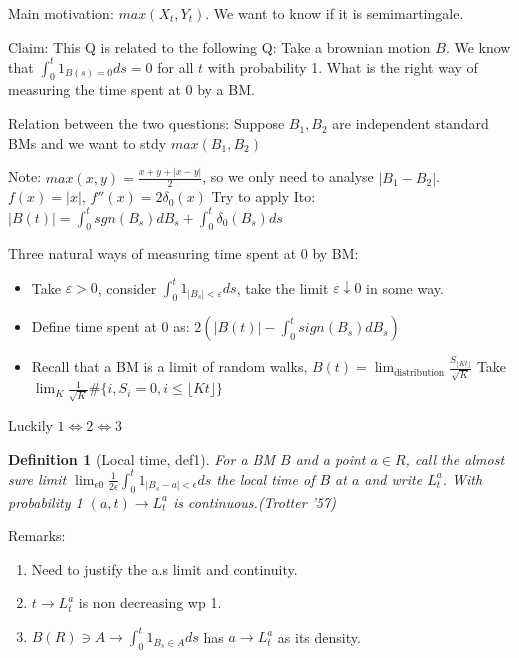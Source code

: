 \documentclass{article}
\newtheorem{definition}{Definition}
\begin{document}
Main motivation:
$max(X_t, Y_t)$. We want to know if it is semimartingale.

Claim:
This Q is related to the following Q:
Take a brownian motion $B$. We know that $\int_0^t 1_{B(s) = 0}ds = 0$ for all $t$ with probability 1.
What is the right way of measuring the time spent at 0 by a BM.

Relation between the two questions:
Suppose $B_1, B_2$ are independent standard BMs and we want to stdy $max(B_1, B_2)$


Note: $max(x, y) = \frac{x+y + |x-y|}{2}$, so we only need to analyse $|B_1 - B_2|$. $f(x) = |x|$, $f''(x) = 2\delta_0(x)$
Try to apply Ito: $|B(t)| = \int_0^t sgn(B_s) dB_s + \int_0^t \delta_0(B_s) ds$


Three natural ways of measuring time spent at 0 by BM:
\begin{itemize}
\item Take $\varepsilon > 0$, consider $\int_0^t 1_{|B_s| < \varepsilon} ds$, take the limit $\varepsilon \downarrow 0$ in some way.
\item Define time spent at 0 as: $2(|B(t)| - \int_0^t sign(B_s) dB_s)$
\item Recall that a BM is a limit of random walks, $B(t) = \lim_{\text{distribution}} \frac{S_{\lfloor Kt \rfloor}}{\sqrt K}$
  Take $\lim_K \frac1{\sqrt K}\# \{ i, S_i = 0, i \le \lfloor Kt \rfloor \}$
\end{itemize}

Luckily $1 \iff 2 \iff 3$

\begin{definition}[Local time, def1]
  For a BM $B$ and a point $a \in R$, call the almost sure limit $\lim_{\epsilon 0} \frac{1}{2\epsilon} \int_0^t 1_{|B_s - a| < \epsilon}ds$ the local time of $B$ at $a$ and write $L_t^a$.
  With probability 1 $(a, t) \rightarrow L_t^a$ is continuous.(Trotter '57)
\end{definition}

Remarks:
\begin{enumerate}
\item Need to justify the a.s limit and continuity.
\item $t \rightarrow L_t^a$ is non decreasing wp 1.
\item $B(R) \ni A \rightarrow \int_0^t 1_{B_s \in A}ds$  has $a \rightarrow L_t^a$ as its density.
\end{enumerate}
\end{document}
